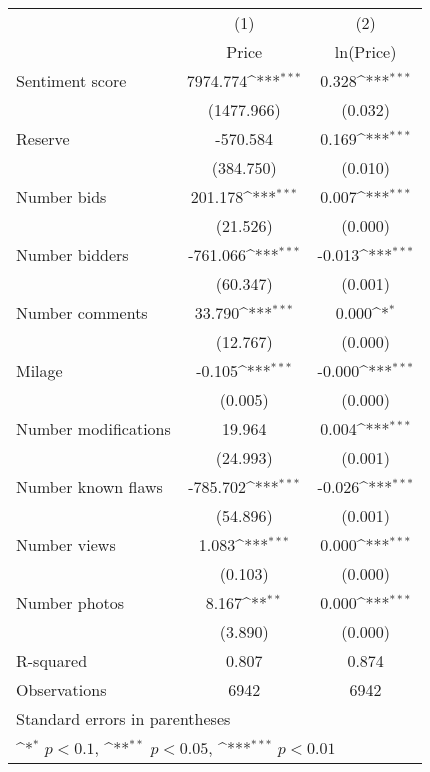 {
\def\sym#1{\ifmmode^{#1}\else\(^{#1}\)\fi}
\begin{tabular}{l*{2}{c}}
\hline\hline
                    &\multicolumn{1}{c}{(1)}&\multicolumn{1}{c}{(2)}\\
                    &\multicolumn{1}{c}{Price}&\multicolumn{1}{c}{ln(Price)}\\
\hline
Sentiment score     &    7974.774\sym{***}&       0.328\sym{***}\\
                    &  (1477.966)         &     (0.032)         \\
[1em]
Reserve             &    -570.584         &       0.169\sym{***}\\
                    &   (384.750)         &     (0.010)         \\
[1em]
Number bids         &     201.178\sym{***}&       0.007\sym{***}\\
                    &    (21.526)         &     (0.000)         \\
[1em]
Number bidders      &    -761.066\sym{***}&      -0.013\sym{***}\\
                    &    (60.347)         &     (0.001)         \\
[1em]
Number comments     &      33.790\sym{***}&       0.000\sym{*}  \\
                    &    (12.767)         &     (0.000)         \\
[1em]
Milage              &      -0.105\sym{***}&      -0.000\sym{***}\\
                    &     (0.005)         &     (0.000)         \\
[1em]
Number modifications&      19.964         &       0.004\sym{***}\\
                    &    (24.993)         &     (0.001)         \\
[1em]
Number known flaws  &    -785.702\sym{***}&      -0.026\sym{***}\\
                    &    (54.896)         &     (0.001)         \\
[1em]
Number views        &       1.083\sym{***}&       0.000\sym{***}\\
                    &     (0.103)         &     (0.000)         \\
[1em]
Number photos       &       8.167\sym{**} &       0.000\sym{***}\\
                    &     (3.890)         &     (0.000)         \\
\hline
R-squared           &       0.807         &       0.874         \\
Observations        &        6942         &        6942         \\
\hline\hline
\multicolumn{3}{l}{\footnotesize Standard errors in parentheses}\\
\multicolumn{3}{l}{\footnotesize \sym{*} \(p<0.1\), \sym{**} \(p<0.05\), \sym{***} \(p<0.01\)}\\
\end{tabular}
}

